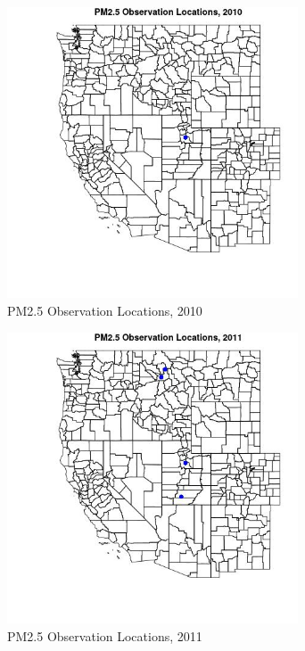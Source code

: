 \begin{figure} 
\centering  
\includegraphics[width=0.77\textwidth]{Code_Outputs/Report_PM25_Step4_part_e_de_duplicated_aves_ML_input_PlotLoc2010.jpg} 
\caption{\label{fig:Report_PM25_Step4_part_e_de_duplicated_aves_ML_inputPlotLoc2010}PM2.5 Observation Locations, 2010} 
\end{figure} 
 

\begin{figure} 
\centering  
\includegraphics[width=0.77\textwidth]{Code_Outputs/Report_PM25_Step4_part_e_de_duplicated_aves_ML_input_PlotLoc2011.jpg} 
\caption{\label{fig:Report_PM25_Step4_part_e_de_duplicated_aves_ML_inputPlotLoc2011}PM2.5 Observation Locations, 2011} 
\end{figure} 
 

